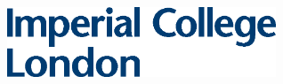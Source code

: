 
\begin{titlepage}

\newcommand{\HRule}{\rule{\linewidth}{0.5mm}} %


\includegraphics[width=8cm]{title/logo.eps}\\[2cm] %
 

\center %





\end{titlepage}
